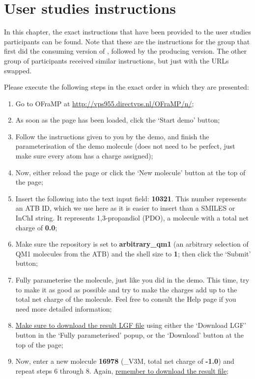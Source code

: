 \chapter{User studies instructions}

In this chapter, the exact instructions that have been provided to the user studies participants can be found. Note that these are the instructions for the group that first did the consuming version of \oframp, followed by the producing version. The other group of participants received similar instructions, but just with the URLs swapped.

Please execute the following steps in the exact order in which they are presented:
\begin{enumerate}
\item Go to OFraMP at \url{http://vps955.directvps.nl/OFraMP/n/};
\item As soon as the page has been loaded, click the `Start demo' button;
\item Follow the instructions given to you by the demo, and finish the parameterisation of the demo molecule (does not need to be perfect, just make sure every atom has a charge assigned);
\item Now, either reload the page or click the `New molecule' button at the top of the page;
\item Insert the following into the text input field: \textbf{10321}. This number represents an ATB ID, which we use here as it is easier to insert than a SMILES or InChI string. It represents 1,3-propandiol (PDO), a molecule with a total net charge of \textbf{0.0};
\item Make sure the repository is set to \textbf{arbitrary\_qm1} (an arbitrary selection of QM1 molecules from the ATB) and the shell size to \textbf{1}; then click the `Submit' button;
\item Fully parameterise the molecule, just like you did in the demo. This time, try to make it as good as possible and try to make the charges add up to the total net charge of the molecule. Feel free to consult the Help page if you need more detailed information;
\item \underline{Make sure to download the result LGF file} using either the `Download LGF' button in the `Fully parameterised' popup, or the `Download' button at the top of the page;
\item Now, enter a new molecule \textbf{16978} (\_V3M, total net charge of \textbf{-1.0}) and repeat steps 6 through 8. Again, \underline{remember to download the result file};

\end{enumerate}
